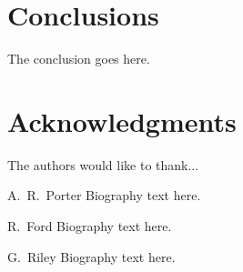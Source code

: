 \documentclass[journal]{IEEEtran}
\begin{document}



\section{Conclusions}
The conclusion goes here.



\section*{Acknowledgments}


The authors would like to thank...




%

% 

\begin{IEEEbiographynophoto}{A.~R.~Porter}
Biography text here.
\end{IEEEbiographynophoto}

\begin{IEEEbiographynophoto}{R.~Ford}
Biography text here.
\end{IEEEbiographynophoto}


\begin{IEEEbiographynophoto}{G.~Riley}
Biography text here.
\end{IEEEbiographynophoto}





\end{document}
